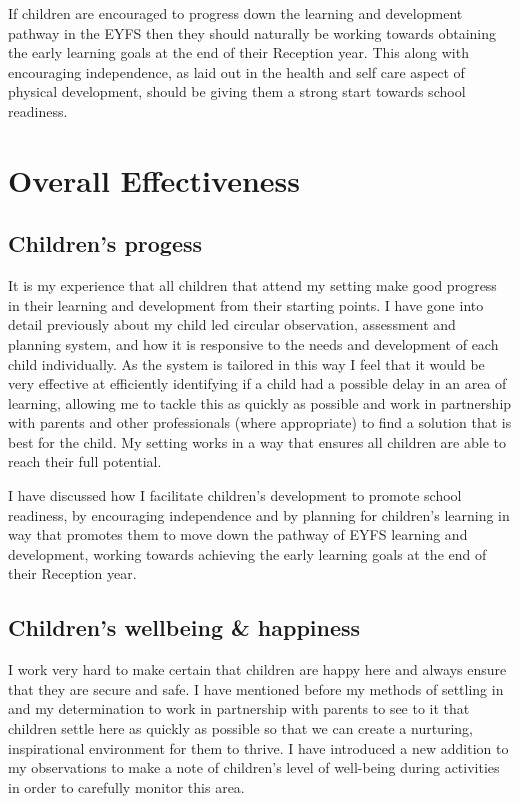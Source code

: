 \documentclass[10pt,a4paper]{report}
\makeatletter
\newcommand{\DESCRIPTION@original@item}{}
\let\DESCRIPTION@original@item\item
\newcommand*{\DESCRIPTION@envir}{DESCRIPTION}
\newlength{\DESCRIPTION@totalleftmargin}
\newlength{\DESCRIPTION@linewidth}
\newcommand{\DESCRIPTION@makelabel}[1]{\llap{#1}}%
\newcommand{\DESCRIPTION@item}[1][]{%
  \setlength{\@totalleftmargin}%
       {\DESCRIPTION@totalleftmargin+\widthof{\textbf{#1 }}-\leftmargin}%
  \setlength{\linewidth}
       {\DESCRIPTION@linewidth-\widthof{\textbf{#1 }}+\leftmargin}%
  \par\parshape \@ne \@totalleftmargin \linewidth
  \DESCRIPTION@original@item[\textbf{#1}]%
}
\newenvironment{DESCRIPTION}
  {\list{}{\setlength{\labelwidth}{0cm}%
           \let\makelabel\DESCRIPTION@makelabel}%
   \setlength{\DESCRIPTION@totalleftmargin}{\@totalleftmargin}%
   \setlength{\DESCRIPTION@linewidth}{\linewidth}%
   \renewcommand{\item}{\ifx\@currenvir\DESCRIPTION@envir
                           \expandafter\DESCRIPTION@item
                        \else
                           \expandafter\DESCRIPTION@original@item
                        \fi}}
  {\endlist}
\makeatother
\begin{document}
\begin{DESCRIPTION}
\begin{DESCRIPTION}
If children are encouraged to progress down the learning and development pathway in the EYFS then they should naturally be working towards obtaining the early learning goals at the end of their Reception year. This along with encouraging independence, as laid out in the health and self care aspect of physical development, should be giving them a strong start towards school readiness.

\chapter{Overall Effectiveness}

\section{Children's progess}

It is my experience that all children that attend my setting make good progress in their learning and development from their starting points. I have gone into detail previously about my child led circular observation, assessment and planning system, and how it is responsive to the needs and development of each child individually. As the system is tailored in this way I feel that it would be very effective at efficiently identifying if a child had a possible delay in an area of learning, allowing me to tackle this as quickly as possible and work in partnership with parents and other professionals (where appropriate) to find a solution that is best for the child. My setting works in a way that ensures all children are able to reach their full potential. 

I have discussed how I facilitate children's development to promote school readiness, by encouraging independence and by planning for children's learning in way that promotes them to move down the pathway of EYFS learning and development, working towards achieving the early learning goals at the end of their Reception year. 

\section{Children's wellbeing \& happiness}

I work very hard to make certain that children are happy here and always ensure that they are secure and safe. I have mentioned before my methods of settling in and my determination to work in partnership with parents to see to it that children settle here as quickly as possible so that we can create a nurturing, inspirational environment for them to thrive. I have introduced a new addition to my observations to make a note of children's level of well-being during activities in order to carefully monitor this area.


\end{DESCRIPTION}
\end{DESCRIPTION}
\end{document}
